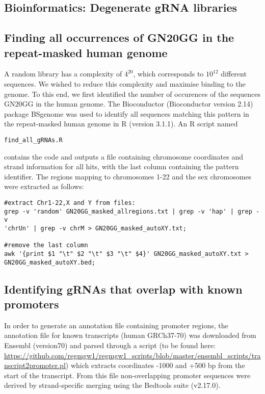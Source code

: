 \begin{footnotesize}

\section{Bioinformatics: Degenerate gRNA libraries}

\subsection{Finding all occurrences of GN20GG in the repeat-masked human genome}
\label{sec:GN20GG in genome}

A random library has a complexity of $4^{20}$, which corresponds to $10^{12}$ different sequences. We wished to reduce this complexity and maximise binding to the genome. To this end, we first identified the number of occurences of the sequences GN20GG in the human genome. The Bioconductor (Bioconductor version 2.14) package BSgenome \citep{BSgenome} was used to identify all sequences matching this pattern in the repeat-masked human genome in R (version 3.1.1). An R script named \begin{lstlisting}find_all_gRNAs.R
\end{lstlisting} 
contains the code and outputs a file containing chromosome coordinates and strand information for all hits, with the last column containing the pattern identifier. The regions mapping to chromosomes 1-22 and the sex chromosomes were extracted as follows:

\begin{lstlisting}
#extract Chr1-22,X and Y from files:
grep -v 'random' GN20GG_masked_allregions.txt | grep -v 'hap' | grep -v 
'chrUn' | grep -v chrM > GN20GG_masked_autoXY.txt;

#remove the last column
awk '{print $1 "\t" $2 "\t" $3 "\t" $4}' GN20GG_masked_autoXY.txt >
GN20GG_masked_autoXY.bed;
\end{lstlisting}

\subsection{Identifying gRNAs that overlap with known promoters}

In order to generate an annotation file containing promoter regions,  the annotation file for known transcripts (human GRCh37-70) was downloaded from Ensembl (version70) and parsed through a script (to be found here: \url{https://github.com/regmgw1/regmgw1_scripts/blob/master/ensembl_scripts/transcript2promoter.pl}) which extracts coordinates -1000 and +500 bp from the start of the transcript. From this file non-overlapping promoter sequences were derived by strand-specific merging using the Bedtools suite (v2.17.0).


\end{footnotesize}
